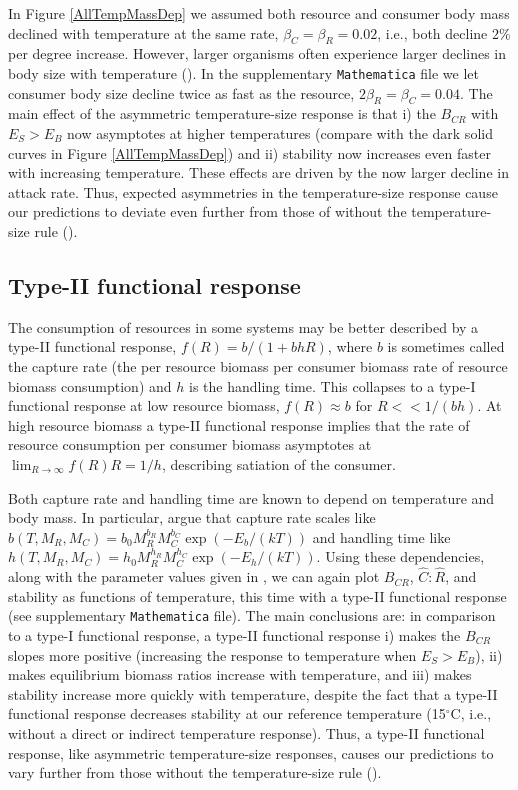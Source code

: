 \documentclass[11pt]{article}
\begin{document}
In Figure \ref{AllTempMassDep} we assumed both resource and consumer body mass declined with temperature at the same rate, $\beta_C = \beta_R = 0.02$, i.e., both decline $2\%$ per degree increase.
However, larger organisms often experience larger declines in body size with temperature (\cite{Forster2012}).
In the supplementary \texttt{Mathematica} file we let consumer body size decline twice as fast as the resource, $2 \beta_R = \beta_C = 0.04$.
The main effect of the asymmetric temperature-size response is that i) the $B_{CR}$ with $E_S > E_B$ now asymptotes at higher temperatures (compare with the dark solid curves in Figure \ref{AllTempMassDep}) and ii) stability now increases even faster with increasing temperature.
These effects are driven by the now larger decline in attack rate.
Thus, expected asymmetries in the temperature-size response cause our predictions to deviate even further from those of without the temperature-size rule (\cite{Gilbert2014}).

\subsection*{Type-II functional response}

The consumption of resources in some systems may be better described by a type-II functional response, $f(R) = b / (1 + b h R)$, where $b$ is sometimes called the capture rate (the per resource biomass per consumer biomass rate of resource biomass consumption) and $h$ is the handling time.
This collapses to a type-I functional response at low resource biomass, $f(R) \approx b$ for $R << 1/(b h)$.
At high resource biomass a type-II functional response implies that the rate of resource consumption per consumer biomass asymptotes at $\lim_{R\rightarrow\infty}f(R) R = 1/h$, describing satiation of the consumer.

Both capture rate and handling time are known to depend on temperature and body mass.
In particular, \cite{Rall2012} argue that capture rate scales like $b(T, M_R, M_C) = b_0 M_R^{b_R} M_C^{b_C} \exp(-E_b/(k T))$ and handling time like $h(T, M_R, M_C) = h_0 M_R^{h_R} M_C^{h_C} \exp(-E_h/(k T))$.
Using these dependencies, along with the parameter values given in \cite{Rall2012}, we can again plot $B_{CR}$, $\hat{C}:\hat{R}$, and stability as functions of temperature, this time with a type-II functional response (see supplementary \texttt{Mathematica} file).
The main conclusions are: in comparison to a type-I functional response, a type-II functional response i) makes the $B_{CR}$ slopes more positive (increasing the response to temperature when $E_S > E_B$), ii) makes equilibrium biomass ratios increase with temperature, and iii) makes stability increase more quickly with temperature, despite the fact that a type-II functional response decreases stability at our reference temperature (15$^\circ$C, i.e., without a direct or indirect temperature response).
Thus, a type-II functional response, like asymmetric temperature-size responses, causes our predictions to vary further from those without the temperature-size rule (\cite{Gilbert2014}).
\end{document}
